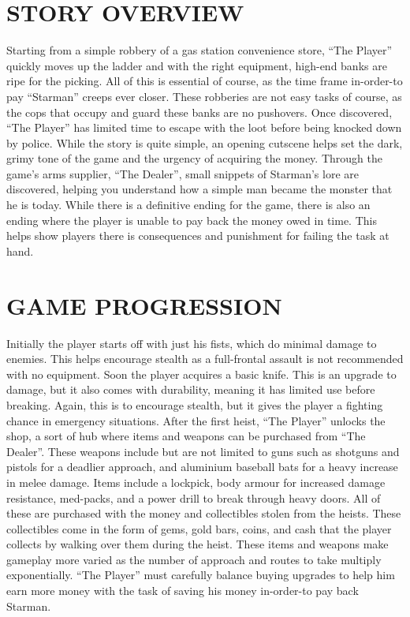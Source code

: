 \documentclass{article}
\begin{document}
\section{STORY OVERVIEW \label{storyover}}
Starting from a simple robbery of a gas station convenience store, “The Player” quickly moves up the ladder and with the right equipment, high-end banks are ripe for the picking. All of this is essential of course, as the time frame in-order-to pay “Starman” creeps ever closer. 
\bigbreak
These robberies are not easy tasks of course, as the cops that occupy and guard these banks are no pushovers. Once discovered, “The Player” has limited time to escape with the loot before being knocked down by police.
\bigbreak
While the story is quite simple, an opening cutscene helps set the dark, grimy tone of the game and the urgency of acquiring the money. Through the game's arms supplier, “The Dealer”, small snippets of Starman's lore are discovered, helping you understand how a simple man became the monster that he is today.
\bigbreak
While there is a definitive ending for the game, there is also an ending where the player is unable to pay back the money owed in time. This helps show players there is consequences and punishment for failing the task at hand.

\section{GAME PROGRESSION \label{progression}}
Initially the player starts off with just his fists, which do minimal damage to enemies. This helps encourage stealth as a full-frontal assault is not recommended with no equipment. Soon the player acquires a basic knife. This is an upgrade to damage, but it also comes with durability, meaning it has limited use before breaking. Again, this is to encourage stealth, but it gives the player a fighting chance in emergency situations.
\bigbreak
After the first heist, “The Player” unlocks the shop, a sort of hub where items and weapons can be purchased from “The Dealer”. These weapons include but are not limited to guns such as shotguns and pistols for a deadlier approach, and aluminium baseball bats for a heavy increase in melee damage.
\bigbreak
Items include a lockpick, body armour for increased damage resistance, med-packs, and a power drill to break through heavy doors.
 \bigbreak
All of these are purchased with the money and collectibles stolen from the heists. These collectibles come in the form of gems, gold bars, coins, and cash that the player collects by walking over them during the heist.
\bigbreak
These items and weapons make gameplay more varied as the number of approach and routes to take multiply exponentially. “The Player” must carefully balance buying upgrades to help him earn more money with the task of saving his money in-order-to pay back Starman.
\end{document}
